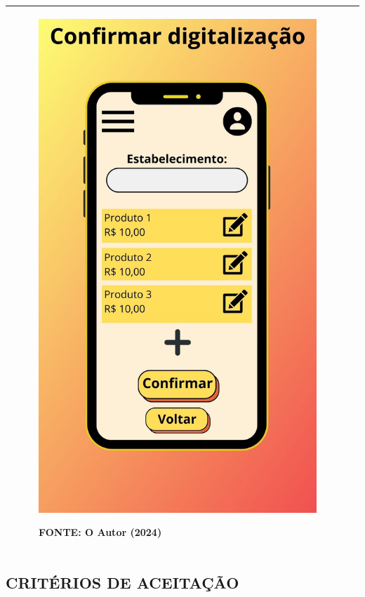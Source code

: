\begin{tabular}{|ll|}
\begin{minipage}{0.48\textwidth}
\begin{figure}[H]
\includegraphics[width=\textwidth]{fig/telas/t_confdigitaliza.jpg}
\footnotesize \centering
\par FONTE: O Autor (2024)
\end{figure}
\end{minipage}
 \\ \hline
\end{tabular}

\subsection*{\textbf{CRITÉRIOS DE ACEITAÇÃO}}

